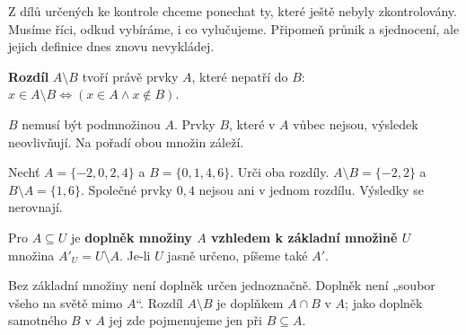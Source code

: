 \documentclass[11pt,a4paper]{article}
\begin{document}
Z dílů určených ke kontrole chceme ponechat ty, které ještě nebyly zkontrolovány.
Musíme říci, odkud vybíráme, i co vylučujeme. Připomeň průnik a sjednocení,
ale jejich definice dnes znovu nevykládej.

\begin{definiceBox}
\textbf{Rozdíl} $A\setminus B$ tvoří právě prvky $A$, které nepatří do $B$:
$x\in A\setminus B\Leftrightarrow (x\in A\land x\notin B)$.
\end{definiceBox}
$B$ nemusí být podmnožinou $A$. Prvky $B$, které v $A$ vůbec nejsou,
výsledek neovlivňují. Na pořadí obou množin záleží.
\begin{prikladReseniBox}[title={P1: dva různé rozdíly},breakable=false]
Nechť $A=\{-2,0,2,4\}$ a $B=\{0,1,4,6\}$. Urči oba rozdíly.
\tcblower
$A\setminus B=\{-2,2\}$ a $B\setminus A=\{1,6\}$.
Společné prvky $0,4$ nejsou ani v jednom rozdílu. Výsledky se nerovnají.
\end{prikladReseniBox}

\begin{definiceBox}
Pro $A\subseteq U$ je \textbf{doplněk množiny $A$ vzhledem k základní množině $U$}
množina $A'_U=U\setminus A$. Je-li $U$ jasně určeno, píšeme také $A'$.
\end{definiceBox}
Bez základní množiny není doplněk určen jednoznačně. Doplněk není
„soubor všeho na světě mimo $A$“. Rozdíl $A\setminus B$ je doplňkem
$A\cap B$ v $A$; jako doplněk samotného $B$ v $A$ jej zde pojmenujeme jen při $B\subseteq A$.

\begin{center}
\end{center}
\end{document}
